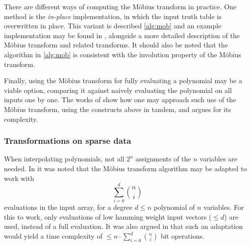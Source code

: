 There are different ways of computing the Möbius transform in practice. One method is the \textit{in-place} implementation, in which the input truth table is overwritten in place. This variant is described \cref{alg:mob} and an example implementation may be found in \cite{joux2009algorithmic}, alongside a more detailed description of the Möbius transform and related transforms. It should also be noted that the algorithm in \cref{alg:mob} is consistent with the involution property of the Möbius transform.

Finally, using the Möbius transform for fully evaluating a polynomial may be a viable option, comparing it against naively evaluating the polynomial on all inputs one by one. The works of \cite{fse-2011-23547} show how one may approach such use of the Möbius transform, using the constructs above in tandem, and argues for its complexity.

\subsubsection{Transformations on sparse data} \label{sec:prereq:poly_interp:sparse}
When interpolating polynomials, not all $2^n$ assignments of the $n$ variables are needed. In \cite{eurocrypt-2021-30841} it was noted that the Möbius transform algorithm may be adapted to work with 
$$
    \sum_{i = 0}^{d} \binom{n}{i}
$$
evaluations in the input array, for a degree $d \leq n$ polynomial of $n$ variables. For this to work, only evaluations of low hamming weight input vectors ($\leq d$) are used, instead of a full evaluation. It was also argued in \cite{eurocrypt-2021-30841} that such an adaptation would yield a time complexity of $\leq n \cdot \sum_{i = 0}^{d}\binom{n}{i}$ bit operations.

\newpage
